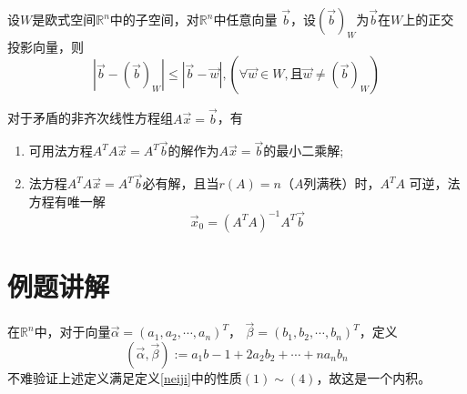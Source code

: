 \begin{thm}[最佳逼近定理]
设$W$是欧式空间$\mathbb{R}^n$中的子空间，对$\mathbb{R}^n$中任意向量
$\vec{b}$，设$(\vec{b})_{W}$为$\vec{b}$在$W$上的正交投影向量，则
\begin{equation*}
|\vec{b}-(\vec{b})_{W}|\leq|\vec{b}-\vec{w}|,(\forall\vec{w}\in W,
\text{且}\vec{w}\neq (\vec{b})_{W})
\end{equation*}
\end{thm}

\begin{thm}
对于矛盾的非齐次线性方程组$A\vec{x}=\vec{b}$，有
\begin{enumerate}
\item 可用法方程$A^TA\vec{x}=A^T\vec{b}$的解作为$A\vec{x}=\vec{b}$的最小二乘解;
\item 法方程$A^TA\vec{x}=A^T\vec{b}$必有解，且当$r(A)=n$（$A$列满秩）时，$A^TA$
可逆，法方程有唯一解
\begin{equation*}
\vec{x}_0=(A^TA)^{-1}A^T\vec{b}
\end{equation*}
\end{enumerate}
\end{thm}


\section{例题讲解}

\begin{eg}
在$\mathbb{R}^n$中，对于向量$\vec{\alpha}=(a_1,a_2,\cdots,a_n)^T$，
$\vec{\beta}=(b_1,b_2,\cdots,b_n)^T$，定义
\begin{equation*}
(\vec{\alpha},\vec{\beta}):=a_1b-1+2a_2b_2+\cdots+na_nb_n
\end{equation*}
不难验证上述定义满足定义\ref{neiji}中的性质$(1)\sim(4)$，故这是一个内积。
\end{eg}

